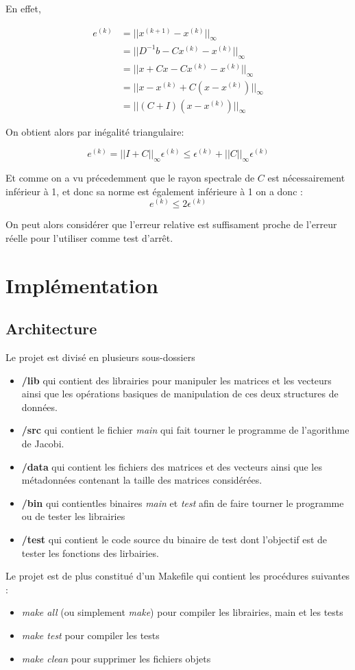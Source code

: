 \documentclass[11pt, a4paper]{article}
\begin{document}
En effet, 

\begin{align}
    e^{(k)} &= ||x^{(k+1)} - x^{(k)}||_{\infty}\\
    &= ||D^{-1}b - Cx^{(k)} - x^{(k)}||_{\infty}\\
    &= ||x + Cx - Cx^{(k)} - x^{(k)}||_{\infty}\\
    &= ||x - x^{(k)} + C(x - x^{(k)})||_{\infty}\\
    &= ||(C + I)(x - x^{(k)})||_{\infty}
\end{align}

On obtient alors par inégalité triangulaire: 

\[
e^{(k)} = ||I + C||_{\infty}\epsilon^{(k)} \leq \epsilon^{(k)} + ||C||_{\infty}\epsilon^{(k)}
\]

Et comme on a vu précedemment que le rayon spectrale de $C$ est nécessairement inférieur à 1, et donc sa norme est également inférieure à 1 on a donc :
\[
e^{(k)} \leq 2\epsilon^{(k)}
\]

On peut alors considérer que l'erreur relative est suffisament proche de l'erreur réelle pour l'utiliser comme test d'arr\^et.

\newpage

\section{Implémentation}

\subsection{Architecture}

Le projet est divisé en plusieurs sous-dossiers
\begin{itemize}
    \item \textbf{/lib} qui contient des librairies pour manipuler les matrices et les vecteurs ainsi que les opérations basiques de manipulation de ces deux structures de données.
    \item \textbf{/src} qui contient le fichier \textit{main} qui fait tourner le programme de l'agorithme de Jacobi.
    \item \textbf{/data} qui contient les fichiers des matrices et des vecteurs ainsi que les métadonnées contenant la taille des matrices considérées.
    \item \textbf{/bin} qui contientles binaires \textit{main} et \textit{test} afin de faire tourner le programme ou de tester les librairies
    \item \textbf{/test} qui contient le code source du binaire de test dont l'objectif est de tester les fonctions des lirbairies.
\end{itemize}
Le projet est de plus constitué d'un Makefile qui contient les procédures suivantes :
\begin{itemize}
    \item \textit{make all} (ou simplement \textit{make}) pour compiler les librairies, main et les tests 
    \item \textit{make test} pour compiler les tests 
    \item \textit{make clean} pour supprimer les fichiers objets
\end{itemize}
\end{document}

